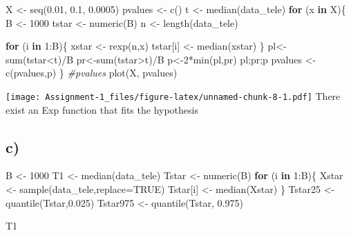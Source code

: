 \documentclass[
]{article}
\newenvironment{Shaded}{\begin{snugshade}}{\end{snugshade}}
\newcommand{\AttributeTok}[1]{\textcolor[rgb]{0.77,0.63,0.00}{#1}}
\newcommand{\CommentTok}[1]{\textcolor[rgb]{0.56,0.35,0.01}{\textit{#1}}}
\newcommand{\ConstantTok}[1]{\textcolor[rgb]{0.00,0.00,0.00}{#1}}
\newcommand{\ControlFlowTok}[1]{\textcolor[rgb]{0.13,0.29,0.53}{\textbf{#1}}}
\newcommand{\DecValTok}[1]{\textcolor[rgb]{0.00,0.00,0.81}{#1}}
\newcommand{\FloatTok}[1]{\textcolor[rgb]{0.00,0.00,0.81}{#1}}
\newcommand{\FunctionTok}[1]{\textcolor[rgb]{0.00,0.00,0.00}{#1}}
\newcommand{\NormalTok}[1]{#1}
\newcommand{\OtherTok}[1]{\textcolor[rgb]{0.56,0.35,0.01}{#1}}
\newcommand{\SpecialCharTok}[1]{\textcolor[rgb]{0.00,0.00,0.00}{#1}}
\begin{document}
\begin{Shaded}
\begin{Highlighting}[]
\NormalTok{X }\OtherTok{\textless{}{-}} \FunctionTok{seq}\NormalTok{(}\FloatTok{0.01}\NormalTok{, }\FloatTok{0.1}\NormalTok{, }\FloatTok{0.0005}\NormalTok{)}
\NormalTok{pvalues }\OtherTok{\textless{}{-}} \FunctionTok{c}\NormalTok{()}
\NormalTok{t }\OtherTok{\textless{}{-}} \FunctionTok{median}\NormalTok{(data\_tele)}
\ControlFlowTok{for}\NormalTok{ (x }\ControlFlowTok{in}\NormalTok{ X)\{}
\NormalTok{  B }\OtherTok{\textless{}{-}} \DecValTok{1000}
\NormalTok{  tstar }\OtherTok{\textless{}{-}} \FunctionTok{numeric}\NormalTok{(B)}
\NormalTok{  n }\OtherTok{\textless{}{-}} \FunctionTok{length}\NormalTok{(data\_tele)}
  
  \ControlFlowTok{for}\NormalTok{ (i }\ControlFlowTok{in} \DecValTok{1}\SpecialCharTok{:}\NormalTok{B)\{}
\NormalTok{    xstar }\OtherTok{\textless{}{-}} \FunctionTok{rexp}\NormalTok{(n,x)}
\NormalTok{    tstar[i] }\OtherTok{\textless{}{-}} \FunctionTok{median}\NormalTok{(xstar)}
\NormalTok{  \}}
\NormalTok{  pl}\OtherTok{\textless{}{-}}\FunctionTok{sum}\NormalTok{(tstar}\SpecialCharTok{\textless{}}\NormalTok{t)}\SpecialCharTok{/}\NormalTok{B}
\NormalTok{  pr}\OtherTok{\textless{}{-}}\FunctionTok{sum}\NormalTok{(tstar}\SpecialCharTok{\textgreater{}}\NormalTok{t)}\SpecialCharTok{/}\NormalTok{B}
\NormalTok{  p}\OtherTok{\textless{}{-}}\DecValTok{2}\SpecialCharTok{*}\FunctionTok{min}\NormalTok{(pl,pr)}
\NormalTok{  pl;pr;p}
\NormalTok{  pvalues }\OtherTok{\textless{}{-}} \FunctionTok{c}\NormalTok{(pvalues,p)}
\NormalTok{\}}
\CommentTok{\#pvalues}
\FunctionTok{plot}\NormalTok{(X, pvalues)}
\end{Highlighting}
\end{Shaded}

\texttt{[image: Assignment-1\_files/figure-latex/unnamed-chunk-8-1.pdf]}
There exist an Exp function that fits the hypothesis

\hypertarget{c-1}{%
\subsection{c)}\label{c-1}}

\begin{Shaded}
\begin{Highlighting}[]
\NormalTok{B }\OtherTok{\textless{}{-}} \DecValTok{1000}
\NormalTok{T1 }\OtherTok{\textless{}{-}} \FunctionTok{median}\NormalTok{(data\_tele)}
\NormalTok{Tstar }\OtherTok{\textless{}{-}} \FunctionTok{numeric}\NormalTok{(B)}
\ControlFlowTok{for}\NormalTok{ (i }\ControlFlowTok{in} \DecValTok{1}\SpecialCharTok{:}\NormalTok{B)\{}
\NormalTok{  Xstar }\OtherTok{\textless{}{-}} \FunctionTok{sample}\NormalTok{(data\_tele,}\AttributeTok{replace=}\ConstantTok{TRUE}\NormalTok{)}
\NormalTok{  Tstar[i] }\OtherTok{\textless{}{-}} \FunctionTok{median}\NormalTok{(Xstar)}
\NormalTok{\}}
\NormalTok{Tstar25 }\OtherTok{\textless{}{-}} \FunctionTok{quantile}\NormalTok{(Tstar,}\FloatTok{0.025}\NormalTok{)}
\NormalTok{Tstar975 }\OtherTok{\textless{}{-}} \FunctionTok{quantile}\NormalTok{(Tstar, }\FloatTok{0.975}\NormalTok{)}

\NormalTok{T1}
\end{Highlighting}
\end{Shaded}
\end{document}
